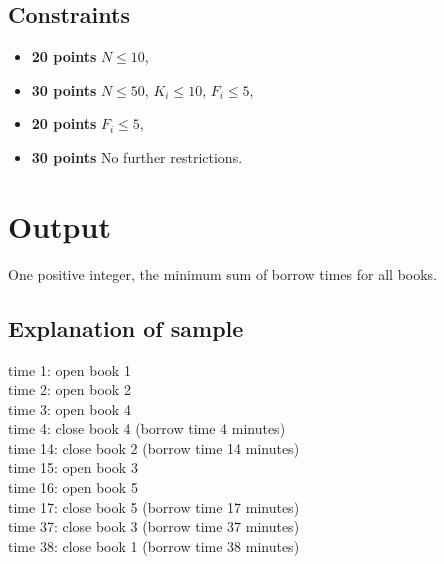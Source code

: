 \subsection*{Constraints}
\begin{itemize}
    \item{\textbf{20 points}} $N \leq 10$,
    \item{\textbf{30 points}} $N \leq 50$, $K_i \leq 10$, $F_i \leq 5$,
    \item{\textbf{20 points}} $F_i \leq 5$,
    \item{\textbf{30 points}} No further restrictions.
\end{itemize}

\section*{Output}
One positive integer, the minimum sum of borrow times for all books.

\subsection*{Explanation of sample} 
time 1: open book 1 \\
time 2: open book 2 \\
time 3: open book 4 \\
time 4: close book 4 (borrow time 4 minutes) \\
time 14: close book 2 (borrow time 14 minutes) \\
time 15: open book 3 \\
time 16: open book 5 \\
time 17: close book 5 (borrow time 17 minutes) \\
time 37: close book 3 (borrow time 37 minutes) \\
time 38: close book 1 (borrow time 38 minutes) \\
